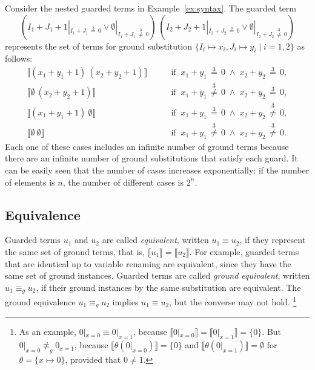 \begin{example}\label{ex:semantics}
Consider the nested guarded terms in Example~\ref{ex:syntax}. The guarded term
\[(I_1 + J_1 + 1 |_{I_1 + J_1 \,\stackrel{3}{=}\, 0} \vee \emptyset |_{I_1 + J_1 \,\stackrel{3}{\not=}\, 0})\ (I_2 + J_2 + 1 |_{I_2 + J_2 \,\stackrel{3}{=}\, 0} \vee \emptyset |_{I_2 + J_2 \,\stackrel{3}{\not=}\, 0})\]
represents the set of terms for ground substitution $\{I_i \mapsto
x_i, J_i \mapsto y_i \mid i = 1, 2\}$ as follows:
%
\begin{align*}
\llbracket (x_1 + y_1 +1)\ (x_2 + y_2 + 1) \rrbracket &\qquad\mbox{if}\;\; x_1 + y_1 \,\stackrel{3}{=}\, 0 \;\wedge\; x_2 + y_2 \,\stackrel{3}{=}\, 0,\\
\llbracket \emptyset\ (x_2 + y_2 + 1) \rrbracket &\qquad\mbox{if}\;\; x_1 + y_1 \,\stackrel{3}{\not=}\, 0 \;\wedge\; x_2 + y_2 \,\stackrel{3}{=}\, 0,\\
\llbracket (x_1 + y_1 +1)\ \emptyset \rrbracket &\qquad\mbox{if}\;\; x_1 + y_1 \,\stackrel{3}{=}\, 0 \;\wedge\; x_2 + y_2 \,\stackrel{3}{\not=}\, 0,\\
\llbracket \emptyset\ \emptyset \rrbracket &\qquad\mbox{if}\;\; x_1 + y_1 \,\stackrel{3}{\not=}\, 0 \;\wedge\; x_2 + y_2 \,\stackrel{3}{\not =}\, 0.
\end{align*}
%
Each one of these cases includes an infinite number of ground terms
because there are an infinite number of ground substitutions that
satisfy each guard. It can be easily seen that the number of cases
increases exponentially: if the number of elements is $n$, the number
of different cases is $2^n$.
\end{example}



\subsection{Equivalence}

Guarded terms $u_1$ and $u_2$ are called \emph{equivalent}, written
$u_1 \equiv u_2$, if they represent the same set of ground terms, that
is, $\llbracket u_1 \rrbracket = \llbracket u_2 \rrbracket$.  For
example, guarded terms that are identical up to variable renaming
are
equivalent, since they have the same set of ground instances.  Guarded
terms are called \emph{ground equivalent}, written $u_1 \equiv_g u_2$,
if their ground instances by the same substitution are equivalent.
The ground equivalence $u_1 \equiv_g u_2$ implies $u_1 \equiv u_2$,
but the converse may not hold.%
\footnote{
As an example, $0 |_{x = 0} \equiv 0|_{x
  = 1}$, because $\llbracket 0 |_{x = 0} \rrbracket = \llbracket 0
|_{x = 1} \rrbracket = \{0\}$.  But $0 |_{x = 0} \not\equiv_g 0_{x =
  1}$, because $\llbracket \theta(0 |_{x = 0}) \rrbracket = \{0\}$ and
$\llbracket \theta(0 |_{x = 1}) \rrbracket = \emptyset$ for $\theta =
\{x \mapsto 0\}$, provided that $0 \neq 1$.}


